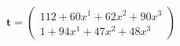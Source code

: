 \documentclass[preview]{standalone}
\begin{document}
\begin{align*}
\mathbf{t} = \begin{pmatrix}112 + 60x^{1} + 62x^{2} + 90x^{3} \\ 1 + 94x^{1} + 47x^{2} + 48x^{3}\end{pmatrix}
\end{align*}
\end{document}

